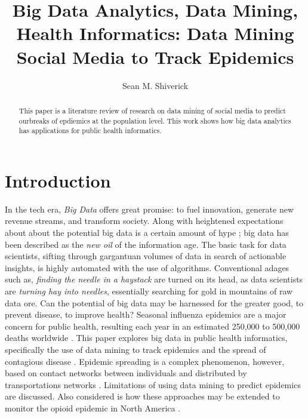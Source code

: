 \documentclass[sigconf]{acmart}
\begin{document}
\title{Big Data Analytics, Data Mining, Health Informatics: 
Data Mining Social Media to Track Epidemics}
\author{Sean M. Shiverick}


\begin{abstract}
This paper is a literature review of research on data mining of social media 
to predict ourbreaks of epdiemics at the population level. This work shows how 
big data analytics has applications for public health informatics.
\end{abstract}


\maketitle

\section{Introduction}

In the tech era, \textit{Big Data} offers great promise: to fuel innovation, 
generate new revenue streams, and transform society. Along with heightened 
expectations about about the potential big data is a certain amount of hype 
\cite{gupta15}; big data has been described as the \textit{new oil} of the 
information age.  The basic task for data scientists, sifting through gargantuan 
volumes of data in search of actionable insights, is highly automated with the 
use of algorithms. Conventional adages such as, \textit{finding the needle in 
a haystack} are turned on its head, as data scientists are \textit{turning hay 
into needles}, essentially searching for gold in mountains of raw data ore. Can 
the potential of big data may be harnessed for the greater good, to prevent 
disease, to improve health? Seasonal influenza epidemics are a major concern 
for public health, resulting each year in an estimated 250,000 to 500,000 deaths 
worldwide \cite{who17}. This paper explores big data in public health informatics, 
specifically the use of data mining to track epidemics and the spread of contagious 
disease \cite{hay13}. Epidemic spreading is a complex phenomenon, however, based 
on contact networks between individuals and distributed by transportations networks 
\cite{Colizza06}. Limitations of using data mining to predict epidemics are 
discussed. Also considered is how these approaches may be extended to monitor 
the opioid epidemic in North America \cite{volkow14}.
\end{document}
